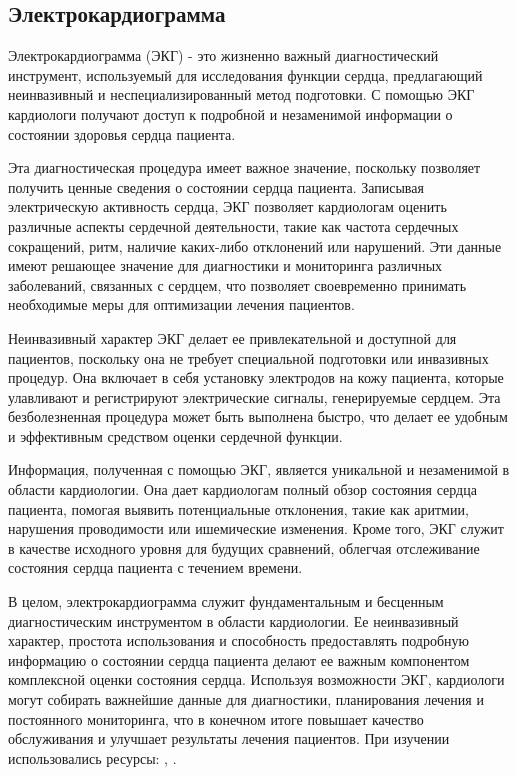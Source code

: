 \subsection{Электрокардиограмма}

Электрокардиограмма (ЭКГ) - это жизненно важный диагностический инструмент, используемый для исследования функции сердца, предлагающий неинвазивный и неспециализированный метод подготовки. С помощью ЭКГ кардиологи получают доступ к подробной и незаменимой информации о состоянии здоровья сердца пациента.

Эта диагностическая процедура имеет важное значение, поскольку позволяет получить ценные сведения о состоянии сердца пациента. Записывая электрическую активность сердца, ЭКГ позволяет кардиологам оценить различные аспекты сердечной деятельности, такие как частота сердечных сокращений, ритм, наличие каких-либо отклонений или нарушений. Эти данные имеют решающее значение для диагностики и мониторинга различных заболеваний, связанных с сердцем, что позволяет своевременно принимать необходимые меры для оптимизации лечения пациентов.

Неинвазивный характер ЭКГ делает ее привлекательной и доступной для пациентов, поскольку она не требует специальной подготовки или инвазивных процедур. Она включает в себя установку электродов на кожу пациента, которые улавливают и регистрируют электрические сигналы, генерируемые сердцем. Эта безболезненная процедура может быть выполнена быстро, что делает ее удобным и эффективным средством оценки сердечной функции.

Информация, полученная с помощью ЭКГ, является уникальной и незаменимой в области кардиологии. Она дает кардиологам полный обзор состояния сердца пациента, помогая выявить потенциальные отклонения, такие как аритмии, нарушения проводимости или ишемические изменения. Кроме того, ЭКГ служит в качестве исходного уровня для будущих сравнений, облегчая отслеживание состояния сердца пациента с течением времени.

В целом, электрокардиограмма служит фундаментальным и бесценным диагностическим инструментом в области кардиологии. Ее неинвазивный характер, простота использования и способность предоставлять подробную информацию о состоянии сердца пациента делают ее важным компонентом комплексной оценки состояния сердца. Используя возможности ЭКГ, кардиологи могут собирать важнейшие данные для диагностики, планирования лечения и постоянного мониторинга, что в конечном итоге повышает качество обслуживания и улучшает результаты лечения пациентов.
При изучении использовались ресурсы: \cite{21}, \cite{22}.

